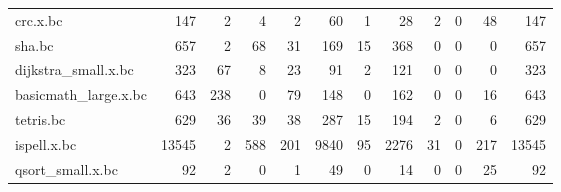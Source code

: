 \begin{table}[ht]
\begin{adjustbox}{width=1.3\textwidth}
\begin{tabular}{lrrrrrrrrrrr}
 crc.x.bc             &                 147 &                    2 &                          4 &                    2 &                       60 &                                  1 &                            28 &                   2 &                                         0 &                                          48 &                  147 \\
 sha.bc               &                 657 &                    2 &                         68 &                   31 &                      169 &                                 15 &                           368 &                   0 &                                         0 &                                           0 &                  657 \\
 dijkstra\_small.x.bc  &                 323 &                   67 &                          8 &                   23 &                       91 &                                  2 &                           121 &                   0 &                                         0 &                                           0 &                  323 \\
 basicmath\_large.x.bc &                 643 &                  238 &                          0 &                   79 &                      148 &                                  0 &                           162 &                   0 &                                         0 &                                          16 &                  643 \\
 tetris.bc            &                 629 &                   36 &                         39 &                   38 &                      287 &                                 15 &                           194 &                   2 &                                         0 &                                           6 &                  629 \\
 ispell.x.bc          &               13545 &                    2 &                        588 &                  201 &                     9840 &                                 95 &                          2276 &                  31 &                                         0 &                                         217 &                13545 \\
 qsort\_small.x.bc     &                  92 &                    2 &                          0 &                    1 &                       49 &                                  0 &                            14 &                   0 &                                         0 &                                          25 &                   92 \\

\end{tabular}
\end{adjustbox}
\end{table}
